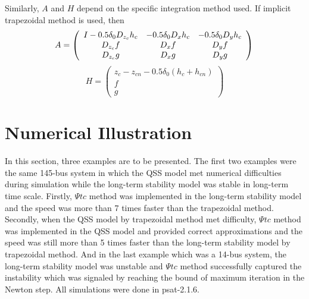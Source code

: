 \documentclass[journal]{IEEEtran}
\begin{document}
Similarly, $A$ and $H$ depend on the specific integration method used. If implicit trapezoidal method is used, then
\begin{equation}
A=\left(\begin{array}{ccc}I-0.5\delta_0D_{z_c} h_c&-0.5\delta_0D_{x} h_c&-0.5\delta_0D_y h_c\\D_{z_c} f&D_x f &D_y f\\D_{z_c} g&D_x g&D_y g\end{array}\right)\nonumber\\
\end{equation}
\begin{equation}
H=\left(\begin{array}{c}z_c-z_{cn}-0.5\delta_0(h_c+h_{cn})\\f\\g\end{array}\right)\nonumber
\end{equation}


\section{Numerical Illustration}\label{sectionnumerical}
In this section, three examples are to be presented. The first two examples were the same 145-bus system in which the QSS model met numerical difficulties during simulation while the long-term stability model was stable in long-term time scale. Firstly, $\Psi tc$ method was implemented in the long-term stability model and the speed was more than 7 times faster than the trapezoidal method. Secondly, when the QSS model by trapezoidal method met difficulty, $\Psi tc$ method was implemented in the QSS model and provided correct approximations and the speed was still more than 5 times faster than the long-term stability model by trapezoidal method. And in the last example which was a 14-bus system, the long-term stability model was unstable and $\Psi tc$ method successfully captured the instability which was signaled by reaching the bound of maximum iteration in the Newton step. All simulations were done in psat-2.1.6\cite{Milano:article}.
\end{document}

